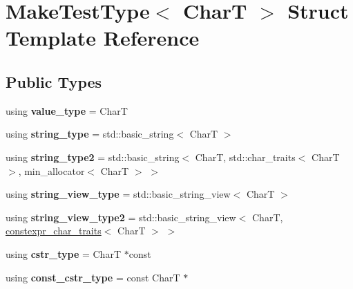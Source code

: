 \hypertarget{struct_make_test_type}{}\section{Make\+Test\+Type$<$ CharT $>$ Struct Template Reference}
\label{struct_make_test_type}
\subsection*{Public Types}
\begin{DoxyCompactItemize}
\item 
\mbox{\label{struct_make_test_type_a0084b030b846d64bdf3f540e2f224871}} 
using {\bfseries value\+\_\+type} = CharT
\item 
\mbox{\label{struct_make_test_type_af17e3818e0fdc4b094b50531a1ce98ec}} 
using {\bfseries string\+\_\+type} = std\+::basic\+\_\+string$<$ CharT $>$
\item 
\mbox{\label{struct_make_test_type_ac71d0fe9197191bdea9f82d6315f5d61}} 
using {\bfseries string\+\_\+type2} = std\+::basic\+\_\+string$<$ CharT, std\+::char\+\_\+traits$<$ CharT $>$, min\+\_\+allocator$<$ CharT $>$ $>$
\item 
\mbox{\label{struct_make_test_type_ae6950f697ce3b197e29013717d7a76e2}} 
using {\bfseries string\+\_\+view\+\_\+type} = std\+::basic\+\_\+string\+\_\+view$<$ CharT $>$
\item 
\mbox{\label{struct_make_test_type_af7f053390d860e698989fc78f759cc39}} 
using {\bfseries string\+\_\+view\+\_\+type2} = std\+::basic\+\_\+string\+\_\+view$<$ CharT, \mbox{\hyperlink{structconstexpr__char__traits}{constexpr\+\_\+char\+\_\+traits}}$<$ CharT $>$ $>$
\item 
\mbox{\label{struct_make_test_type_afe230920f2e1663001b4ac84de54965f}} 
using {\bfseries cstr\+\_\+type} = CharT $\ast$const
\item 
\mbox{\label{struct_make_test_type_a2de04f2fe7d5eec6bfb465aba79ba3be}} 
using {\bfseries const\+\_\+cstr\+\_\+type} = const CharT $\ast$

\end{DoxyCompactItemize}
